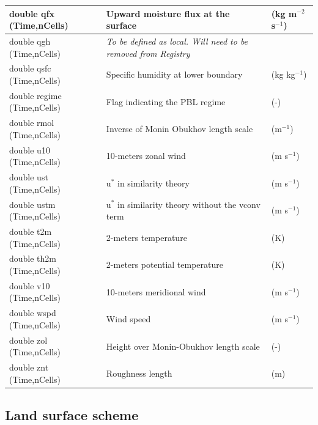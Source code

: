\documentclass[11pt]{report}
\begin{document}
{\begin{longtable}{|p{2.0in} |p{3.0in} |p{1.0in} |}
double qfx (Time,nCells) & Upward moisture flux at the surface & (kg m$^{-2}$ s$^{-1}$) \\ \hline
double qgh (Time,nCells) & \em{To be defined as local. Will need to be removed from Registry} & \\ \hline
double qsfc (Time,nCells) & Specific humidity at lower boundary & (kg kg$^{-1}$) \\ \hline
double regime (Time,nCells) & Flag indicating the PBL regime & (-) \\ \hline
double rmol (Time,nCells) & Inverse of Monin Obukhov length scale & (m$^{-1}$) \\ \hline
double u10 (Time,nCells) & 10-meters zonal wind & (m s$^{-1}$) \\ \hline
double ust (Time,nCells) & u$^{*}$ in similarity theory & (m s$^{-1}$) \\ \hline
double ustm (Time,nCells) & u$^{*}$ in similarity theory without the vconv term & (m s$^{-1}$) \\ \hline
double t2m (Time,nCells) & 2-meters temperature & (K) \\ \hline
double th2m (Time,nCells) & 2-meters potential temperature & (K) \\ \hline
double v10 (Time,nCells) & 10-meters meridional wind & (m s$^{-1}$) \\ \hline
double wspd (Time,nCells) & Wind speed & (m s$^{-1}$) \\ \hline
double zol (Time,nCells) & Height over Monin-Obukhov length scale & (-) \\ \hline
double znt (Time,nCells) & Roughness length & (m) \\ \hline
\end{longtable}
}

\subsection{Land surface scheme}
\end{document}
